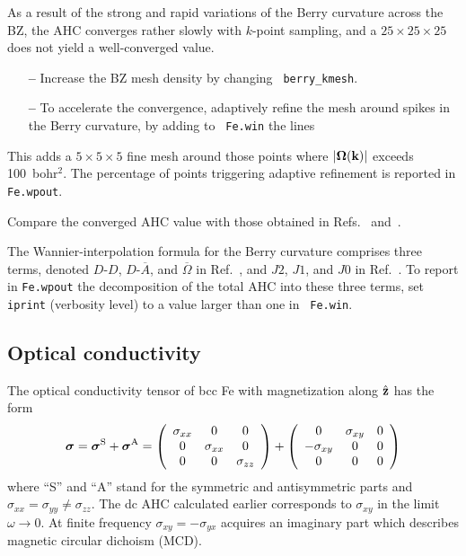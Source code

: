 \documentclass[a4paper,11pt,twoside]{article}
\begin{document}
As a result of the strong and rapid variations of the Berry curvature
across the BZ, the AHC converges rather slowly with $k$-point
sampling, and a $25\times 25\times 25$ does not yield a well-converged
value.

  \begin{itemize}

  \item[{\bf --}] Increase the BZ mesh density by changing {\tt
      berry\_kmesh}.

  \item[{\bf --}] To accelerate the convergence, adaptively refine the
    mesh around spikes in the Berry curvature, by adding to {\tt
      Fe.win} the lines 

  \end{itemize}
    
    This adds a $5\times 5\times 5$ fine mesh around those points
    where $\vert{\bm \Omega}({\bf k})\vert$ exceeds 100~bohr$^2$. The
    percentage of points triggering adaptive refinement is reported in
    {\tt Fe.wpout}.

    Compare the converged AHC value with those obtained in
    Refs.~\cite{wang-prb06} and~\cite{yao-prl04}.

    The Wannier-interpolation formula for the Berry curvature
    comprises three terms, denoted $D$-$D$, $D$-$\overline{A}$, and
    $\overline{\Omega}$ in Ref.~\cite{wang-prb06}, and $J2$, $J1$, and
    $J0$ in Ref.~\cite{lopez-prb12}.  To report in {\tt Fe.wpout} the
    decomposition of the total AHC into these three terms, set {\tt
      iprint} (verbosity level) to a value larger than one in {\tt
      Fe.win}.

\subsection*{Optical conductivity}

The optical conductivity tensor of bcc Fe with magnetization along
$\hat{\bf z}$ has the form
%
$$
\bm{\sigma}=\bm{\sigma}^{\rm S}+\bm{\sigma}^{\rm A}=
\left(
\begin{array}{ccc}
\sigma_{xx} & 0 & 0\\
0 & \sigma_{xx} & 0\\
0 & 0 & \sigma_{zz}
\end{array}
\right)+
\left(
\begin{array}{ccc}
0 & \sigma_{xy} & 0 \\
-\sigma_{xy} & 0 & 0\\
0 & 0 & 0
\end{array}
\right)$$
%
where ``S'' and ``A'' stand for the symmetric and antisymmetric parts
and $\sigma_{xx}=\sigma_{yy}\not=\sigma_{zz}$. The dc AHC calculated
earlier corresponds to $\sigma_{xy}$ in the limit $\omega\rightarrow
0$. At finite frequency $\sigma_{xy}=-\sigma_{yx}$ acquires an
imaginary part which describes magnetic circular dichoism (MCD).
\end{document}
